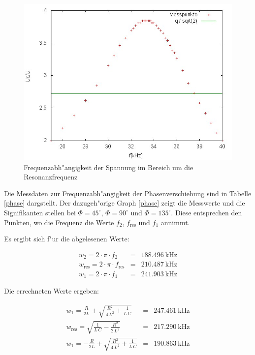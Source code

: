 	\begin{figure}[htbp]
		\centering
		\includegraphics[width = 12cm]{img/graph_c_1.jpg}
		\caption{Frequenzabh"angigkeit der Spannung im Bereich um die Resonanzfrequenz}
		\label{frequenz_2}
	\end{figure}

	Die Messdaten zur Frequenzabh"angigkeit der Phasenverschiebung sind in Tabelle \eqref{phase} dargstellt.
	Der dazugeh"orige Graph \eqref{phase} zeigt die Messwerte und die Signifikanten stellen bei $\Phi = 45^\circ$, $\Phi = 90^\circ$ und $\Phi = 135^\circ$.
	Diese entsprechen den Punkten, wo die Frequenz die Werte $f_2$, $f_\mathrm{res}$ und $f_1$ annimmt.

	Es ergibt sich f"ur die abgelesenen Werte:

	\begin{eqnarray*}
		w_2 = 2 \cdot \pi \cdot f_2 &=& \SI{188.496}{\kilo \hertz}\\
		w_\mathrm{res} = 2 \cdot \pi \cdot f_\mathrm{res} &=& \SI{210.487}{\kilo \hertz}\\
		w_1 = 2 \cdot \pi \cdot f_1 &=& \SI{241.903}{\kilo \hertz}
	\end{eqnarray*}

	Die errechneten Werte ergeben:

	\begin{eqnarray*}
		w_1 = \frac{R}{2L} + \sqrt{\frac{R^2}{4\,L^2} + \frac{1}{L \, C}} &=& \SI{247.461}{\kilo \hertz}\\
		w_\mathrm{res} = \sqrt{\frac{1}{L\, C} - \frac{R^2}{2 \, L^2}} &=& \SI{217.290}{\kilo \hertz}\\
		w_1 = -\frac{R}{2L} + \sqrt{\frac{R^2}{4\,L^2} + \frac{1}{L \, C}} &=& \SI{190.863}{\kilo \hertz}
	\end{eqnarray*}

